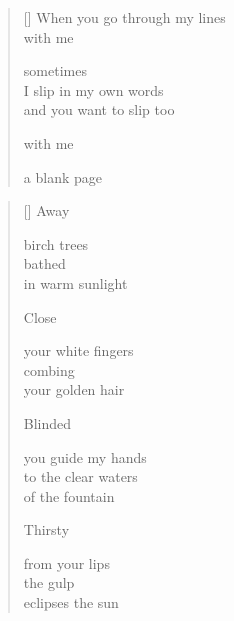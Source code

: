 \documentclass[12pt,a4paper]{article}
\begin{document}

\newpage

\poemtitle{}

\settowidth{\versewidth}{When you go through my lines}

\bigskip

\begin{verse}[\versewidth]
  When you go through my lines \\
  with me

  sometimes \\
  I slip in my own words \\
  and you want to slip too

  with me

  a blank page
\end{verse}


\newpage

\poemtitle{}

\settowidth{\versewidth}{to the clear waters}

\bigskip

\begin{verse}[\versewidth]
  Away

  birch trees \\
  bathed \\
  in warm sunlight

  Close

  your white fingers \\
  combing \\
  your golden hair

  Blinded

  you guide my hands \\
  to the clear waters \\
  of the fountain

  Thirsty

  from your lips \\
  the gulp \\
  eclipses the sun
\end{verse}


\newpage

\poemtitle{}

\settowidth{\versewidth}{to the halo of your blond hair}
\end{document}
